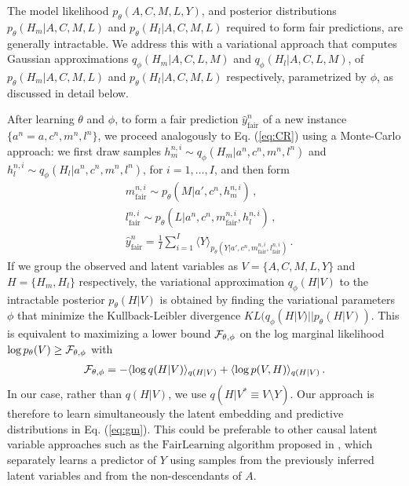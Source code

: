\documentclass{article}
\renewcommand{\eqref}[1]{Eq. (\ref{#1})}
\newcommand{\av}[1]{\langle #1 \rangle}
\begin{document}
The model likelihood $p_{\theta}(A,C,M,L,Y)$, and posterior distributions $p_{\theta}(H_m|A,C,M,L)$ and $p_{\theta}(H_l|A,C,M,L)$ required to form fair predictions, are generally intractable. 
We address this with a variational approach that computes Gaussian approximations $q_{\phi}(H_m|A,C,L,M)$ and $q_{\phi}(H_l|A,C,L,M)$, of $p_{\theta}(H_m|A,C,M,L)$ and $p_{\theta}(H_l|A,C,M,L)$ respectively, 
parametrized by $\phi$, as discussed in detail below. 

After learning $\theta$ and $\phi$, to form a fair prediction $\hat y^n_{\textrm{fair}}$ of a new instance $\{a^n=a,c^n,m^n,l^n\}$, we proceed analogously to \eqref{eq:CR} using a Monte-Carlo approach: 
we first draw samples $h^{n,i}_m \sim q_{\phi}(H_m|a^n,c^n,m^n,l^n)$ and $h^{n,i}_l \sim q_{\phi}(H_l|a^n,c^n,m^n,l^n)$, for $i=1,\ldots,I$, and then form 
\begin{align}
&m^{n,i}_{\textrm{fair}} \sim  p_{\theta}(M|a',c^n,h^{n,i}_m)\,,\nonumber\\
&l^{n,i}_{\textrm{fair}} \sim p_{\theta}(L|a^n,c^n,m^{n,i}_{\textrm{fair}},h^{n,i}_l)\,,\nonumber\\
&\hat y^n_{\textrm{fair}}=\frac{1}{I}\sum_{i=1}^I\av{Y}_{p_{\theta}(Y|a',c^n,m^{n,i}_{\textrm{fair}},l^{n,i}_{\textrm{fair}})}\,.
\label{eq:gm}
\end{align} 
If we group the observed and latent variables as $V=\{A,C,M,L,Y\}$ and $H=\{H_m,H_l\}$ respectively,
the variational approximation $q_{\phi}(H|V)$ to the intractable posterior $p_{\theta}(H|V)$ is obtained
by finding the variational parameters $\phi$ that minimize the Kullback-Leibler divergence  $KL(q_{\phi}(H|V)||p_{\theta}(H|V))$. 
This is equivalent to maximizing a lower bound ${\cal F}_{\theta,\phi}$ on the log marginal likelihood 
$\log p_{\theta}(V)\geq {\cal F}_{\theta,\phi}$ with
\begin{align*}
{\cal F}_{\theta,\phi} =  -\av{\log q(H|V)}_{q(H|V)}+\av{\log p(V,H)}_{q(H|V)}\,.
\end{align*}
In our case, rather than $q(H|V)$, we use $q(H|V^* \equiv V\setminus Y)$. 
Our approach is therefore to learn simultaneously the latent embedding and predictive distributions in \eqref{eq:gm}. 
This could be preferable to other causal latent variable approaches such as the $\textrm{FairLearning}$ algorithm proposed in \citet{kusner17counterfactual},
which separately learns a predictor of $Y$ using samples from the previously inferred latent variables and from the non-descendants of $A$.
\end{document}
